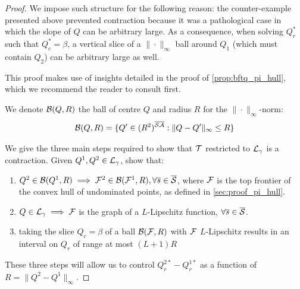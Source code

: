 \begin{subappendices}
\begin{proof}
	We impose such structure for the following reason: the counter-example presented above prevented contraction because it was a pathological case in which the slope of $Q$ can be arbitrary large. As a consequence, when solving $Q_r^*$ such that $Q_c^*=\beta$, a vertical slice of a $\|\cdot\|_\infty$ ball around $Q_1$ (which must contain $Q_2$) can be arbitrary large as well.
	
	This proof makes use of insights detailed in the proof of \autoref{prop:bftq_pi_hull}, which we recommend the reader to consult first.
	
	We denote $\mathcal{B}(Q,R)$ the ball of centre $Q$ and radius $R$ for the $\|\cdot\|_\infty$-norm:
	\begin{equation*}
	\mathcal{B}(Q,R) = \{Q'\in(R^2)^{\overline{\mathcal{S}}\overline{\mathcal{A}}}: \|Q-Q'\|_\infty \leq R\}
	\end{equation*}
	
	We give the three main steps required to show that $\mathcal{T}$ restricted to $\mathcal{L}_\gamma$ is a contraction. Given $Q^1, Q^2\in\mathcal{L}_\gamma$, show that:
	\begin{enumerate}
		\item $Q^2\in\mathcal{B}(Q^1,R)\implies\mathcal{F}^2\in\mathcal{B}(\mathcal{F}^1, R), \forall\overline{s}\in\overline{\mathcal{S}}$, where $\mathcal{F}$ is the top frontier of the convex hull of undominated points, as defined in \autoref{sec:proof_pi_hull}.
		\item $Q\in\mathcal{L}_\gamma \implies \mathcal{F}$ is the graph of a $L$-Lipschitz function, $\forall\overline{s}\in\overline{\mathcal{S}}$.
		\item taking the slice $Q_c=\beta$ of a ball $\mathcal{B}(\mathcal{F},R)$ with $\mathcal{F}$ $L$-Lipschitz results in an interval on $Q_r$ of range at most $(L+1)R$
	\end{enumerate}
	
	These three steps will allow us to control $Q_r^{2*} - Q_r^{1*}$ as a function of $R = \|Q^2-Q^1\|_\infty$.
	

\end{proof}
\end{subappendices}
